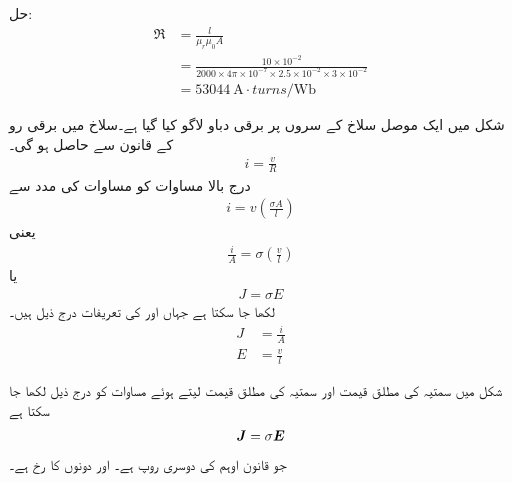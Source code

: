 حل:
\begin{align*}
\Re& = \frac{l}{\mu_r \mu_0 A}\\
&=\frac{10\times 10^{-2}}{2000 \times 4 \pi \times 10^{-7} \times 2.5 \times 10^{-2} \times 3 \times 10^{-2}}\\
&=\SI{53044}{\ampere \cdot turns \per \weber}
\end{align*}

شکل   میں ایک موصل سلاخ کے سروں پر برقی دباو    لاگو کیا گیا ہے۔سلاخ میں  برقی رو    کے قانون  سے حاصل ہو گی۔
\begin{align}
i=\frac{v}{R}
\end{align}
درج بالا مساوات کو مساوات   کی مدد سے
\begin{align}
i=v \left(\frac{\sigma A}{l}\right)
\end{align}
یعنی
\begin{align}
\frac{i}{A}=\sigma \left(\frac{v}{l} \right)
\end{align}
یا
\begin{align}\label{مساوات_مقناطیسی_دور_اوہم_قانون_کی_تفرق_شکل}
J =\sigma E
\end{align}
لکھا جا سکتا ہے جہاں   اور  کی تعریفات درج ذیل ہیں۔
\begin{align}
J&=\frac{i}{A} \label{مساوات_مقناطیسی_دور_کثافت_رو}\\
E&=\frac{v}{l} \label{مساوات_مقناطیسی_دور_برقی_شدت}
\end{align}

شکل   میں سمتیہ  کی مطلق قیمت   اور سمتیہ  کی مطلق قیمت  لیتے ہوئے  مساوات  کو درج ذیل لکھا جا سکتا ہے
\begin{align}
{\ensuremath{{\boldsymbol{J}}}}=\sigma {\ensuremath{{\boldsymbol{E}}}}
\end{align}
جو قانون اوہم کی دوسری روپ ہے۔  اور  دونوں کا رخ    ہے۔

